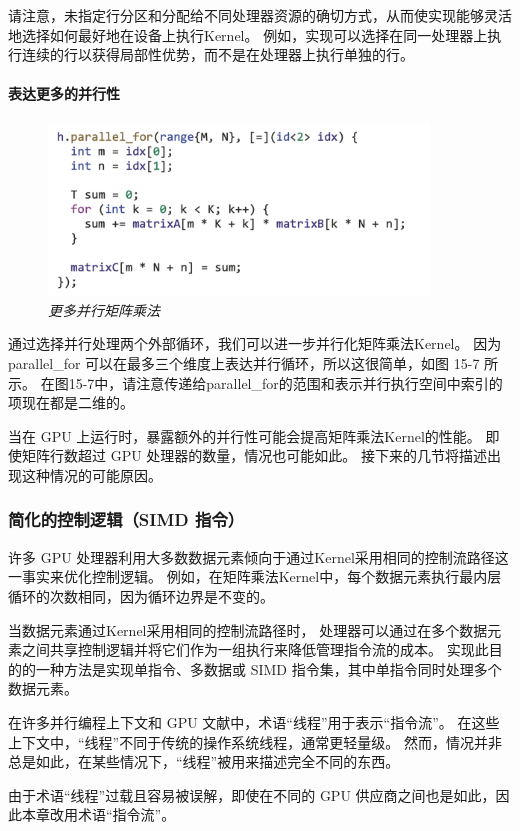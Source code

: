 请注意，未指定行分区和分配给不同处理器资源的确切方式，从而使实现能够灵活地选择如何最好地在设备上执行Kernel。 
例如，实现可以选择在同一处理器上执行连续的行以获得局部性优势，而不是在处理器上执行单独的行。

\paragraph{表达更多的并行性}

\begin{figure}[H]
	\centering
	\includegraphics[width=0.9\textwidth]{figs/F15.7.png}
	\caption{\textit{更多并行矩阵乘法 }}
\end{figure}

通过选择并行处理两个外部循环，我们可以进一步并行化矩阵乘法Kernel。 
因为 parallel\_for 可以在最多三个维度上表达并行循环，所以这很简单，如图 15-7 所示。 
在图15-7中，请注意传递给parallel\_for的范围和表示并行执行空间中索引的项现在都是二维的。

当在 GPU 上运行时，暴露额外的并行性可能会提高矩阵乘法Kernel的性能。 
即使矩阵行数超过 GPU 处理器的数量，情况也可能如此。 接下来的几节将描述出现这种情况的可能原因。

\subsubsection{简化的控制逻辑（SIMD 指令）}
许多 GPU 处理器利用大多数数据元素倾向于通过Kernel采用相同的控制流路径这一事实来优化控制逻辑。 
例如，在矩阵乘法Kernel中，每个数据元素执行最内层循环的次数相同，因为循环边界是不变的。

当数据元素通过Kernel采用相同的控制流路径时，
处理器可以通过在多个数据元素之间共享控制逻辑并将它们作为一组执行来降低管理指令流的成本。 
实现此目的的一种方法是实现单指令、多数据或 SIMD 指令集，其中单指令同时处理多个数据元素。

\begin{remark}[线程 VS.指令流]
在许多并行编程上下文和 GPU 文献中，术语“线程”用于表示“指令流”。
在这些上下文中，“线程”不同于传统的操作系统线程，通常更轻量级。
然而，情况并非总是如此，在某些情况下，“线程”被用来描述完全不同的东西。

由于术语“线程”过载且容易被误解，即使在不同的 GPU 供应商之间也是如此，因此本章改用术语“指令流”。
\end{remark}

